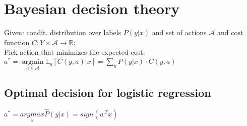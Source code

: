 \section*{Bayesian decision theory}
Given: condit. distribution over labels $P(y|x)$ and set of actions $\mathcal{A}$ and cost function $C:Y\times \mathcal{A} \rightarrow \mathbb{R}$:\\
Pick action that minimizes the expected cost:
$a^* = \underset{a \in \mathcal{A}}{\operatorname{argmin}} \mathbb{E}_y[C(y,a)|x] = \sum_y P(y|x) \cdot C(y,a)$ 
\subsection*{Optimal decision for logistic regression}
$a^* = \underset{y}{argmax} \hat{P}(y|x) = sign(w^T x)$



